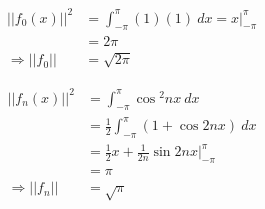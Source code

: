 \begin{align*}
||f_0(x)||^2 &= \int_{-\pi}^{\pi} (1)(1) \ dx = x\Bigr|_{-\pi}^{\pi} \\
&=2\pi \\
\Rightarrow ||f_0|| &= \sqrt{2\pi}
\end{align*}

\vspace{0.25cm}
\begin{align*}
||f_n(x)||^2 &= \int_{-\pi}^{\pi} \cos{^2nx} \ dx \\
&= \frac{1}{2}\int_{-\pi}^{\pi}\left(1+\cos{2nx}\right) \ dx \\
&= \frac{1}{2}x + \frac{1}{2n}\sin{2nx}\Bigr|_{-\pi}^{\pi} \\
&= \pi \\
\Rightarrow ||f_n|| &= \sqrt{\pi}
\end{align*}

